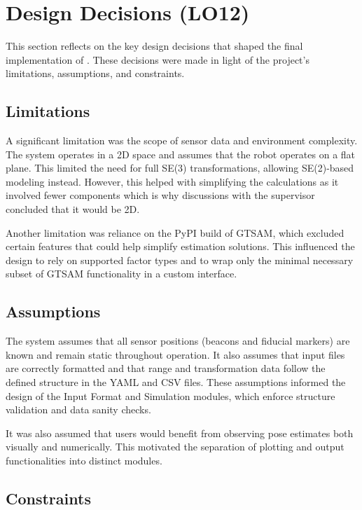 \documentclass{article}
\begin{document}
\section{Design Decisions (LO12)}

This section reflects on the key design decisions that shaped the final implementation of \progname. These decisions were made in light of the project's limitations, assumptions, and constraints.

\subsection*{Limitations}

A significant limitation was the scope of sensor data and environment complexity. The system operates in a 2D space and assumes that the robot operates on a flat plane. This limited the need for full SE(3) transformations, allowing SE(2)-based modeling instead. However, this helped with simplifying the calculations as it involved fewer components which is why discussions with the supervisor concluded that it would be 2D. 

Another limitation was reliance on the PyPI build of GTSAM, which excluded certain features that could help simplify estimation solutions. This influenced the design to rely on supported factor types and to wrap only the minimal necessary subset of GTSAM functionality in a custom interface.

\subsection*{Assumptions}

The system assumes that all sensor positions (beacons and fiducial markers) are known and remain static throughout operation. It also assumes that input files are correctly formatted and that range and transformation data follow the defined structure in the YAML and CSV files. These assumptions informed the design of the Input Format and Simulation modules, which enforce structure validation and data sanity checks.

It was also assumed that users would benefit from observing pose estimates both visually and numerically. This motivated the separation of plotting and output functionalities into distinct modules.

\subsection*{Constraints}
\end{document}
